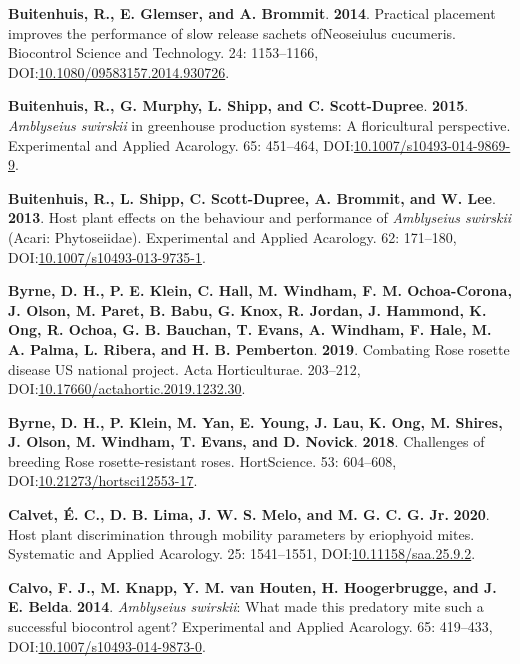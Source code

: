 \documentclass[12pt,final,CPage]{ufthesis}
\newlength{\cslhangindent}
\newenvironment{CSLReferences}[2] %
{%
	\setlength{\parindent}{0pt}
	\ifodd #1 \everypar{\setlength{\hangindent}{\cslhangindent}}\ignorespaces\fi
	\ifnum #2 > 0
	\setlength{\parskip}{#2\baselineskip}
	\fi
}%
{}
\begin{document}
{\begin{CSLReferences}{1}{0}
  \leavevmode{}%
  \textbf{Buitenhuis, R., E. Glemser, and A. Brommit}. \textbf{2014}. Practical placement improves the performance of slow release sachets {ofNeoseiulus} cucumeris. Biocontrol Science and Technology. 24: 1153--1166, DOI:\href{https://doi.org/10.1080/09583157.2014.930726}{10.1080/09583157.2014.930726}.

  \leavevmode{}%
  \textbf{Buitenhuis, R., G. Murphy, L. Shipp, and C. Scott-Dupree}. \textbf{2015}. {\emph{Amblyseius swirskii}} in greenhouse production systems: A floricultural perspective. Experimental and Applied Acarology. 65: 451--464, DOI:\href{https://doi.org/10.1007/s10493-014-9869-9}{10.1007/s10493-014-9869-9}.

  \leavevmode{}%
  \textbf{Buitenhuis, R., L. Shipp, C. Scott-Dupree, A. Brommit, and W. Lee}. \textbf{2013}. Host plant effects on the behaviour and performance of {\emph{Amblyseius swirskii}} ({Acari}: {Phytoseiidae}). Experimental and Applied Acarology. 62: 171--180, DOI:\href{https://doi.org/10.1007/s10493-013-9735-1}{10.1007/s10493-013-9735-1}.

  \leavevmode{}%
  \textbf{Byrne, D. H., P. E. Klein, C. Hall, M. Windham, F. M. Ochoa-Corona, J. Olson, M. Paret, B. Babu, G. Knox, R. Jordan, J. Hammond, K. Ong, R. Ochoa, G. B. Bauchan, T. Evans, A. Windham, F. Hale, M. A. Palma, L. Ribera, and H. B. Pemberton}. \textbf{2019}. Combating {Rose rosette disease} {US} national project. Acta Horticulturae. 203--212, DOI:\href{https://doi.org/10.17660/actahortic.2019.1232.30}{10.17660/actahortic.2019.1232.30}.

  \leavevmode{}%
  \textbf{Byrne, D. H., P. Klein, M. Yan, E. Young, J. Lau, K. Ong, M. Shires, J. Olson, M. Windham, T. Evans, and D. Novick}. \textbf{2018}. Challenges of breeding {Rose rosette}-resistant roses. {HortScience}. 53: 604--608, DOI:\href{https://doi.org/10.21273/hortsci12553-17}{10.21273/hortsci12553-17}.

  \leavevmode{}%
  \textbf{Calvet, É. C., D. B. Lima, J. W. S. Melo, and M. G. C. G. Jr.} \textbf{2020}. Host plant discrimination through mobility parameters by eriophyoid mites. Systematic and Applied Acarology. 25: 1541--1551, DOI:\href{https://doi.org/10.11158/saa.25.9.2}{10.11158/saa.25.9.2}.

  \leavevmode{}%
  \textbf{Calvo, F. J., M. Knapp, Y. M. van Houten, H. Hoogerbrugge, and J. E. Belda}. \textbf{2014}. {\emph{Amblyseius swirskii}}: What made this predatory mite such a successful biocontrol agent? Experimental and Applied Acarology. 65: 419--433, DOI:\href{https://doi.org/10.1007/s10493-014-9873-0}{10.1007/s10493-014-9873-0}.


\end{CSLReferences}}
\end{document}
